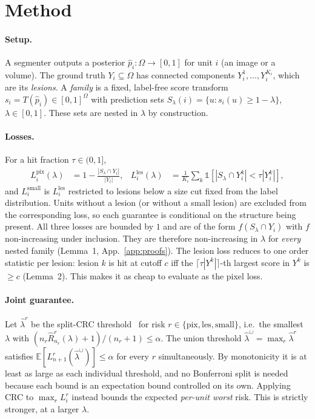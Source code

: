 \section{Method}\label{sec:method}

\paragraph{Setup.}
A segmenter outputs a posterior $\hat p_i:\Omega\to[0,1]$ for unit $i$ (an image
or a volume). The ground truth $Y_i\subseteq\Omega$ has connected components
$Y_i^1,\dots,Y_i^{K_i}$, which are its \emph{lesions}. A \emph{family} is a fixed,
label-free score transform $s_i=T(\hat p_i)\in[0,1]^\Omega$ with prediction sets
$S_\lambda(i)=\{u: s_i(u)\ge 1-\lambda\}$, $\lambda\in[0,1]$. These sets are nested
in $\lambda$ by construction.

\paragraph{Losses.}
For a hit fraction $\tau\in(0,1]$,
\begin{align*}
L^{\mathrm{pix}}_i(\lambda) &= 1-\tfrac{|S_\lambda\cap Y_i|}{|Y_i|}, &
L^{\mathrm{les}}_i(\lambda) &= \tfrac{1}{K_i}\textstyle\sum_k \mathbb 1\!\left[|S_\lambda\cap Y_i^k|<\tau|Y_i^k|\right],
\end{align*}
and $L^{\mathrm{small}}_i$ is $L^{\mathrm{les}}_i$ restricted to lesions below a
size cut fixed from the label distribution. Units without a lesion (or without a
small lesion) are excluded from the corresponding loss, so each guarantee is
conditional on the structure being present. All three losses are bounded by $1$
and are of the form $f(S_\lambda\cap Y_i)$ with $f$ non-increasing under
inclusion. They are therefore non-increasing in $\lambda$ for \emph{every}
nested family (Lemma~1, App.~\ref{app:proofs}). The lesion loss reduces to one
order statistic per lesion: lesion $k$ is hit at cutoff $c$ iff the
$\lceil\tau|Y^k|\rceil$-th largest score in $Y^k$ is $\ge c$ (Lemma~2). This makes
it as cheap to evaluate as the pixel loss.

\paragraph{Joint guarantee.}
Let $\hat\lambda^r$ be the split-CRC threshold~\cite{angelopoulos2024crc} for
risk $r\in\{\mathrm{pix},\mathrm{les},\mathrm{small}\}$, i.e.\ the smallest
$\lambda$ with $(n_r\hat R^r_{n_r}(\lambda)+1)/(n_r+1)\le\alpha$. The union
threshold $\hat\lambda^\cup=\max_r\hat\lambda^r$ satisfies
$\mathbb E[L^r_{n+1}(\hat\lambda^\cup)]\le\alpha$ for every $r$ simultaneously.
By monotonicity it is at least as large as each individual threshold, and no
Bonferroni split is needed because each bound is an expectation bound controlled
on its own. Applying CRC to $\max_r L^r_i$ instead bounds the expected
\emph{per-unit worst} risk. This is strictly stronger, at a larger $\lambda$.

